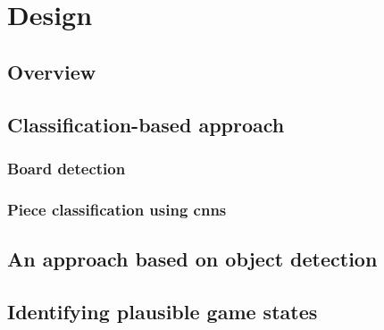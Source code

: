 \documentclass[../main.tex]{subfiles}
\begin{document}
\chapter{Design}
\section{Overview}


\section{Classification-based approach}
\subsection{Board detection}
\subsection{Piece classification using \glspl{cnn}}

\section{An approach based on object detection}
\section{Identifying plausible game states}
\end{document}
